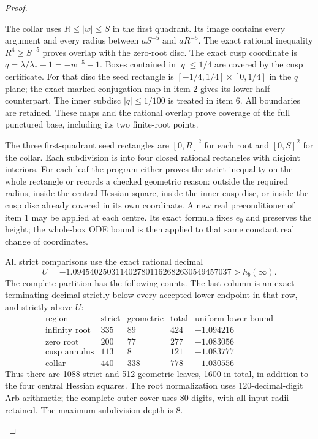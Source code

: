 \begin{proof}
\begin{enumerate}[label={$\langle1\rangle$\arabic*.}]
The collar uses $R\le|w|\le S$ in the first quadrant.
Its image contains every argument and every radius between
$aS^{-5}$ and $aR^{-5}$.  The exact rational inequality
$R^4\ge S^{-5}$ proves overlap with the zero-root disc.
The exact cusp coordinate is
$q=\lambda/\lambda_*-1=-w^{-5}-1$.
Boxes contained in $|q|\le1/4$ are covered by the cusp certificate.
For that disc the seed rectangle is
$[-1/4,1/4]\times[0,1/4]$ in the $q$ plane; the exact marked
conjugation map in item 2 gives its lower-half counterpart.
The inner subdisc $|q|\le1/100$ is treated in item 6.
All boundaries are retained.  These maps and the rational overlap
prove coverage of the full punctured base, including its two
finite-root points.

The three first-quadrant seed rectangles are $[0,R]^2$ for
each root and $[0,S]^2$ for the collar.  Each subdivision is into
four closed rational rectangles with disjoint interiors.
For each leaf the program either proves the strict inequality
on the whole rectangle or records a checked geometric reason:
outside the required radius, inside the central Hessian square,
inside the inner cusp disc, or inside the cusp disc already
covered in its own coordinate.  A new real preconditioner of
item 1 may be applied at each centre.  Its exact formula fixes
$e_0$ and preserves the height; the whole-box ODE bound is then
applied to that same constant real change of coordinates.

All strict comparisons use the exact rational decimal
\[
 U=-1.0945402503114027801162682630549457037>h_b(\infty).
\]
The complete partition has the following counts. The last
column is an exact terminating decimal strictly below every
accepted lower endpoint in that row, and strictly above $U$:
\[
\begin{array}{lrrrr}
 \text{region}&\text{strict}&\text{geometric}&\text{total}
     &\text{uniform lower bound}\\\hline
 \text{infinity root}&335&89&424&-1.094216\\
 \text{zero root}&200&77&277&-1.083056\\
 \text{cusp annulus}&113&8&121&-1.083777\\
 \text{collar}&440&338&778&-1.030556
\end{array}
\]
Thus there are 1088 strict and 512 geometric leaves, 1600 in total,
in addition to the four central Hessian squares.
The root normalization uses 120-decimal-digit Arb arithmetic;
the complete outer cover uses 80 digits, with all input radii
retained.  The maximum subdivision depth is 8.


\end{enumerate}
\end{proof}
